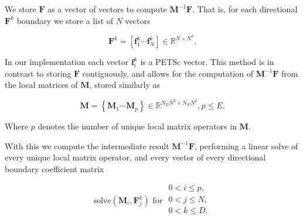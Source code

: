 \begin{center}
\pgfplotsset{compat=newest, width=\columnwidth}
\end{center}



\noindent
We store $\textbf{F}$ as a vector of vectors to compute $\textbf{M}^{-1}\textbf{F}$. That is, for each directional $\textbf{F}^k$ boundary we store a list of $N$ vectors

\begin{equation}
	\textbf{F}^k = \left[\textbf{f}^k_1 \cdots \textbf{f}^k_N\right] \in \mathbb{R}^{N \times N^2}.
\end{equation} 

\noindent
In our implementation each vector $\textbf{f}^k_i$ is a PETSc vector. This method is in contrast to storing $\textbf{F}$ contiguously, and allows for the computation of $\textbf{M}^{-1}\textbf{F}$ from the local matrices of $\textbf{M}$, stored similarly as

\begin{equation}
	\textbf{M} = \left\{\textbf{M}_1 \cdots \textbf{M}_p\right\} \in \mathbb{R}^{N_{E}N^2 \times N_{E}N^2}, p \leq E.
\end{equation} 

\noindent 
Where $p$ denotes the number of unique local matrix operators in $\textbf{M}$. 

With this we compute the intermediate result $\textbf{M}^{-1}\textbf{F}$, performing a linear solve of every unique local matrix operator, and every vector of every directional boundary coefficient matrix 

\begin{equation}
	\text{solve}(\textbf{M}_{i}, \textbf{F}^{k}_j) \text{  for }
	\begin{array}{l}
		0 < i \leq p, \\
		0 < j \leq N, \\
		0 < k \leq D. \\ 
	\end{array}
\end{equation}

